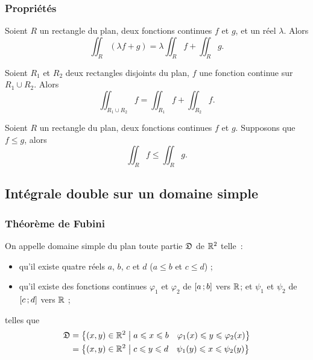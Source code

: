 \subsubsection{Propriétés}

\begin{prop}
  Soient $R$ un rectangle du plan, deux fonctions continues $f$ et $g$, et un réel $\lambda$. Alors
  \begin{equation}
    \iint_R (\lambda f+g) = \lambda \iint_R f + \iint_R g.
  \end{equation}
\end{prop}
\begin{prop}
  Soient $R_1$ et $R_2$ deux rectangles disjoints du plan, $f$ une fonction continue sur $R_1 \cup R_2$. Alors
  \begin{equation}
    \iint_{R_1 \cup R_2} f = \iint_{R_1} f + \iint_{R_2} f.
  \end{equation}
\end{prop}
\begin{prop}
  Soient $R$ un rectangle du plan, deux fonctions continues $f$ et $g$. Supposons que $f \leqslant g$, alors
  \begin{equation}
    \iint_R f \leqslant \iint_R g.
  \end{equation}
\end{prop}

\subsection{Intégrale double sur un domaine simple}

\subsubsection{Théorème de Fubini}

\begin{defdef}
  On appelle domaine simple du plan toute partie $\mathfrak{D}$ de $\mathbb{R}^2$ telle~:
  \begin{itemize}
  \item qu'il existe quatre réels $a$, $b$, $c$ et $d$ ($a\leqslant b$ et $c \leqslant d$) ;
  \item qu'il existe des fonctions continues $\varphi_1$ et $\varphi_2$ de $\left[ a \, ;  b \right]$ vers $\mathbb{R}$; et $\psi_1$ et $\psi_2$ de $\left[ c \, ;  d \right]$ vers $\mathbb{R}$ ;
  \end{itemize}
  telles que
  \begin{align}
    \mathfrak{D}&=\left\{(x,y)\in\mathbb{R}^2\mathrel{}\middle|\mathrel{}a\leqslant x\leqslant b \quad \varphi_1(x)\leqslant y\leqslant \varphi_2(x)\right\}\\
    &=\left\{(x,y)\in\mathbb{R}^2\mathrel{}\middle|\mathrel{}c \leqslant y \leqslant d \quad \psi_1(y) \leqslant x \leqslant \psi_2(y)\right\}
  \end{align}
\end{defdef}

